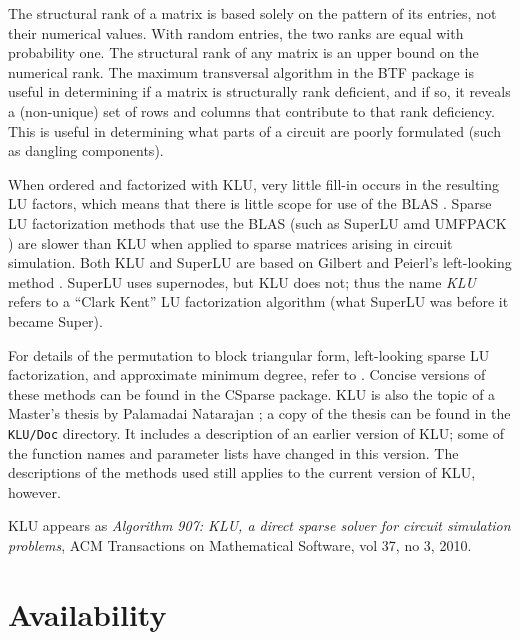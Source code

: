 \documentclass[11pt]{article}
\begin{document}
The structural rank of a matrix is based solely on the pattern of its entries,
not their numerical values.  With random entries, the two ranks are equal with
probability one.   The structural rank of any matrix is an upper bound on the
numerical rank.  The maximum transversal algorithm in the BTF package is useful
in determining if a matrix is structurally rank deficient, and if so, it
reveals a (non-unique) set of rows and columns that contribute to that rank
deficiency.  This is useful in determining what parts of a circuit are poorly
formulated (such as dangling components).

When ordered and factorized with KLU, very little fill-in occurs in the
resulting LU factors, which means that there is little scope for use of the
BLAS \cite{ACM679a}.  Sparse LU factorization methods that use the BLAS (such
as SuperLU \cite{SuperLU99} amd UMFPACK \cite{Davis03_algo,Davis03}) are slower
than KLU when applied to sparse matrices arising in circuit simulation.  Both
KLU and SuperLU are based on Gilbert and Peierl's left-looking method
\cite{GilbertPeierls88}.  SuperLU uses supernodes, but KLU does not; thus the
name {\em KLU} refers to a ``Clark Kent'' LU factorization algorithm (what
SuperLU was before it became Super).

For details of the permutation to block triangular form, left-looking sparse
LU factorization, and approximate minimum degree, refer to \cite{Davis06book}.
Concise versions of these methods can be found in the CSparse package.  KLU is
also the topic of a Master's thesis by Palamadai Natarajan \cite{Palamadai05};
a copy of
the thesis can be found in the {\tt KLU/Doc} directory.  It includes a
description of an earlier version of KLU; some of the function names and
parameter lists have changed in this version.  The descriptions of the methods
used still applies to the current version of KLU, however.

KLU appears as {\em Algorithm 907: KLU, a direct sparse solver for circuit
simulation problems}, ACM Transactions on Mathematical Software, vol 37, no 3,
2010.

\section{Availability}
\end{document}
